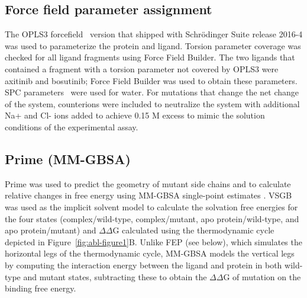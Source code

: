 \documentclass[phd,tocprelim]{cornell}
\begin{document}
\subsection{Force field parameter assignment}
The OPLS3 forcefield~\citep{Harder:J.Chem.TheoryComput.:2016} version that shipped with Schr\"{o}dinger Suite release 2016-4 was used to parameterize the protein and ligand.
Torsion parameter coverage was checked for all ligand fragments using Force Field Builder. 
The two ligands that contained a fragment with a torsion parameter not covered by OPLS3 were axitinib and bosutinib; Force Field Builder was used to obtain these parameters. 
SPC parameters~\citep{Berendsen:IntermolecularForces:1981} were used for water. For mutations that change the net change of the system, counterions were included to neutralize the system with additional Na+ and Cl- ions added to achieve 0.15 M excess to mimic the solution conditions of the experimental assay.

\subsection{Prime (MM-GBSA)}
Prime was used to predict the geometry of mutant side chains and to calculate relative changes in free energy using MM-GBSA single-point estimates \citep{Rapp:J.Chem.Inf.Model.:2011}. VSGB \citep{Shivakumar:J.Chem.TheoryComput.:2010} was used as the implicit solvent model to calculate the solvation free energies for the four states (complex/wild-type, complex/mutant, apo protein/wild-type, and apo protein/mutant) and $\Delta\Delta$G calculated using the thermodynamic cycle depicted in Figure~\ref{fig:abl-figure1}B. 
Unlike FEP (see below), which simulates the horizontal legs of the thermodynamic cycle, MM-GBSA models the vertical legs by computing the interaction energy between the ligand and protein in both wild-type and mutant states, subtracting these to obtain the $\Delta\Delta$G of mutation on the binding free energy.
\end{document}
